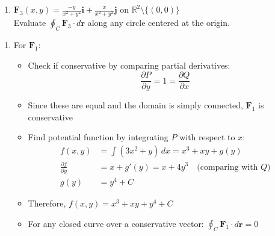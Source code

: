 \begin{example}
\begin{enumerate}
\item $\mathbf{F}_3(x,y) = \frac{-y}{x^2 + y^2}\mathbf{i} + \frac{x}{x^2 + y^2}\mathbf{j}$ on $\mathbb{R}^2\setminus\{(0,0)\}$\\
Evaluate $\oint_C \mathbf{F}_3\cdot d\mathbf{r}$ along any circle centered at the origin.
\end{enumerate}

\begin{solution}
\begin{enumerate}
\item For $\mathbf{F}_1$:
    \begin{itemize}
        \item Check if conservative by comparing partial derivatives:
        \[
        \frac{\partial P}{\partial y} = 1 = \frac{\partial Q}{\partial x}
        \]
        \item Since these are equal and the domain is simply connected, $\mathbf{F}_1$ is conservative
        \item Find potential function by integrating $P$ with respect to $x$:
        \begin{align*}
        f(x,y) &= \int (3x^2 + y)\,dx = x^3 + xy + g(y) \\
        \frac{\partial f}{\partial y} &= x + g'(y) = x + 4y^3 \quad \text{(comparing with $Q$)} \\
        g(y) &= y^4 + C
        \end{align*}
        \item Therefore, $f(x,y) = x^3 + xy + y^4 + C$
        \item For any closed curve over a conservative vector: $\oint_C \mathbf{F}_1\cdot d\mathbf{r} = 0$
    \end{itemize}


\end{enumerate}
\end{solution}
\end{example}
